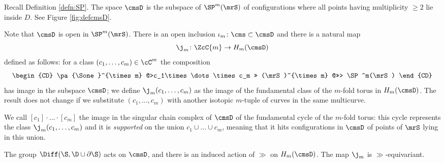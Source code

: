 \begin{defn}
 \label{defn:cmsD}
 Recall Definition \ref{defn:SP}.
 The space $\cmsD$ is the subspace of $\SP^m(\mrS)$ of configurations where all points
 having multiplicity $\geq 2$ lie inside $D$.
 See Figure \ref{fig:defcmsD}.
 
  Note that $\cmsD$ is open in $\SP^m(\mrS)$. There is an open inclusion $\iota_m\colon\cms\subset\cmsD$ and there is a natural map
  \[
  \j_m\colon \ZcC{m}\to H_m(\cmsD)
  \]
  defined as follows: for a class $(c_1,\dots,c_m)\in\cC^m$
  the composition
  \[
   \begin{CD}
    \pa{\Sone}^{\times m} @>c_1\times\dots\times c_m >> (\mrS)^{\times m} @>>> \SP^m(\mrS)
   \end{CD}
  \]
has image in the subspace $\cmsD$; we define $\j_m(c_1,\dots,c_m)$ as the image
of the fundamental class
of the $m$-fold torus in $H_m(\cmsD)$. The result does not change
if we substitute $(c_1,\dots,c_m)$ with another isotopic $m$-tuple of curves in the same multicurve.

We call $[c_1]\cdot\ldots\cdot[c_m]$ the image in the singular chain complex of $\cmsD$ of
the fundamental cycle of the
$m$-fold torus: this cycle represents the class $\j_m(c_1,\dots,c_m)$ and it is \emph{supported}
on the union $c_1\cup\dots\cup c_m$, meaning that it hits configurations in $\cmsD$ of points of $\mrS$
lying in this union.

The group $\Diff(\S,\D\cup\partial\S)$ acts on $\cmsD$, and there is an induced action of $\gg$
on $H_m(\cmsD)$. The map $\j_m$ is $\gg$-equivariant.
\end{defn}

